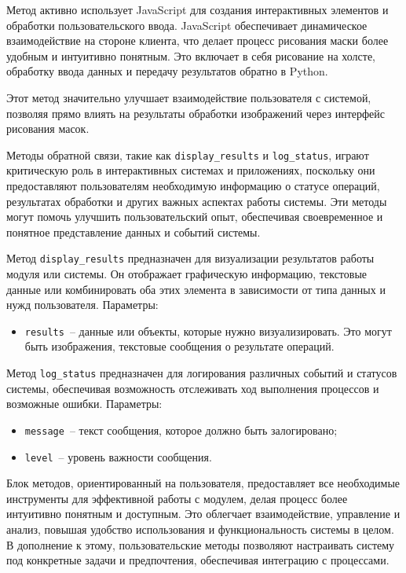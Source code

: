 Метод активно использует JavaScript для создания интерактивных элементов и обработки пользовательского ввода. JavaScript обеспечивает динамическое взаимодействие на стороне клиента, что делает процесс рисования маски более удобным и интуитивно понятным. Это включает в себя рисование на холсте, обработку ввода данных и передачу результатов обратно в Python.

Этот метод значительно улучшает взаимодействие пользователя с системой, позволяя прямо влиять на результаты обработки изображений через интерфейс рисования масок.

Методы обратной связи, такие как \lstinline{display_results} и \lstinline{log_status}, играют критическую роль в интерактивных системах и приложениях, поскольку они предоставляют пользователям необходимую информацию о статусе операций, результатах обработки и других важных аспектах работы системы. Эти методы могут помочь улучшить пользовательский опыт, обеспечивая своевременное и понятное представление данных и событий системы.

Метод \lstinline{display_results} предназначен для визуализации результатов работы модуля или системы. Он отображает графическую информацию, текстовые данные или комбинировать оба этих элемента в зависимости от типа данных и нужд пользователя. Параметры:

\begin{itemize}
    \item \lstinline{results}~-- данные или объекты, которые нужно визуализировать. Это могут быть изображения, текстовые сообщения о результате операций.
\end{itemize}

Метод \lstinline{log_status} предназначен для логирования различных событий и статусов системы, обеспечивая возможность отслеживать ход выполнения процессов и возможные ошибки. Параметры:

\begin{itemize}
    \item \lstinline{message}~-- текст сообщения, которое должно быть залогировано;
    \item \lstinline{level}~-- уровень важности сообщения.
\end{itemize}

Блок методов, ориентированный на пользователя, предоставляет все необходимые инструменты для эффективной работы с модулем, делая процесс более интуитивно понятным и доступным. Это облегчает взаимодействие, управление и анализ, повышая удобство использования и функциональность системы в целом. В дополнение к этому, пользовательские методы позволяют настраивать систему под конкретные задачи и предпочтения, обеспечивая интеграцию с  процессами.

